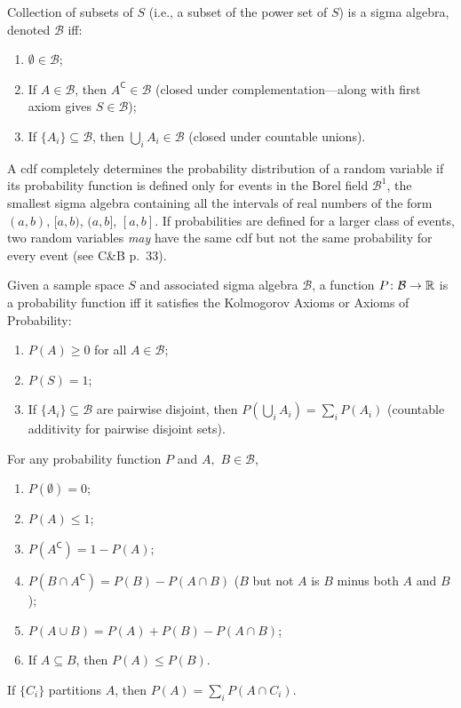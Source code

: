 \documentclass[8pt,letterpaper, landscape]{extarticle} %
\newcommand{\B}{\ensuremath{\mathcal{B}}}
\begin{document}
\begin{multicols}{3}
\begin{description}
 Collection of subsets of $ S $ (i.e., a subset of the power set of $ S $) is a sigma algebra, denoted \B{} iff:
\begin{enumerate}
\item $ \emptyset \in \B $;
\item If $ A \in \B $, then $ A^{\mathsf{C}} \in \B $ (closed under complementation---along with first axiom gives $ S \in \B $);
\item If $ \{ A_i \} \subseteq \B $, then $ \bigcup_i A_i \in \B $ (closed under countable unions).
\end{enumerate}
A cdf completely determines the probability distribution of a random variable if its probability function is defined only for events in the Borel field $ \B^1 $\index{B1 (Borel field)@$ \B^1 $ (Borel field)}, the smallest sigma algebra containing all the intervals of real numbers of the form $ (a, b)$, $[a, b)$, $(a, b]$, $[a,b]$. If probabilities are defined for a larger class of events, two random variables \textit{may} have the same cdf but not the same probability for every event (see C\&B p.~33).

 Given a sample space $ S $ and associated sigma algebra \B, a function $ P \colon \B \to \R  $ is a probability function iff it satisfies the Kolmogorov Axioms or Axioms of Probability:
\begin{enumerate}
\item $ P(A) \geq 0 $ for all $ A \in \B $;
\item $ P(S) = 1 $;
\item If $ \{ A_i \} \subseteq \B $ are pairwise disjoint, then $ P(\bigcup_i A_i) = \sum_i P(A_i) $ (countable additivity for pairwise disjoint sets).
\end{enumerate}
For any probability function $ P $ and $ A, $ $ B \in \B $,
\begin{enumerate}
\item $ P(\emptyset) = 0 $;
\item $ P (A) \leq 1 $;
\item $ P(A^{\mathsf{C}}) = 1 - P(A) $;
\item $ P (B \cap A^{\mathsf{C}}) = P(B) - P (A \cap B) $ ($B$ but not $A$ is $ B $ minus both $ A $ and $ B $);
\item $ P (A \cup B) = P(A) + P(B) - P(A \cap B) $;
\item If $ A \subseteq B $, then $ P(A) \leq P(B) $.
\end{enumerate}
If $ \{ C_i \} $ partitions $ A $, then $ P(A) = \sum_i P(A \cap C_i) $.


\end{description}
\end{multicols}
\end{document}
